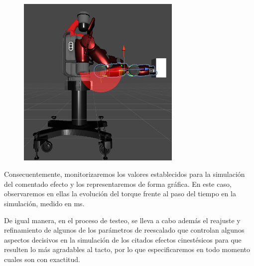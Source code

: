 \begin{figure}[htb]
\begin{minipage}{0.34\textwidth}
    \includegraphics[width=0.7\textwidth]{imagenes/Baxter_Grabbing/LateralViewGrabbing.png}     
    \caption{}\label{Fig:z_axis_baxter}
   \end{minipage}
\end{figure}

Consecuentemente, monitorizaremos los valores establecidos para la simulación del comentado efecto y los representaremos de forma gráfica. En este caso, observaremos en ellas la evolución del torque frente al paso del tiempo en la simulación, medido en ms.

De igual manera, en el proceso de testeo, se lleva a cabo además el reajuste y refinamiento de algunos de los parámetros de reescalado que controlan algunos aspectos decisivos en la simulación de los citados efectos cinestésicos para que resulten lo más agradables al tacto, por lo que especificaremos en todo momento cuales son con exactitud.


\begin{figure}[htb]
   \begin{minipage}{0.33\textwidth}
     \centering
     
    \caption{}\label{Fig:no_filter_pentration_test_x}
   \end{minipage}\hfill
   \begin{minipage}{0.33\textwidth}
     \centering
     
    \caption{}\label{Fig:no_filter_pentration_test_y}
   \end{minipage}
   \begin{minipage}{0.33\textwidth}
     \centering
         
    \caption{}\label{Fig:no_filter_pentration_test_z}
   \end{minipage}\hfill
\end{figure}

